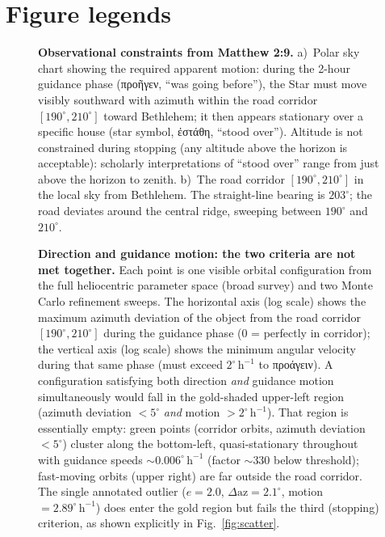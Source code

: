 \documentclass[sn-nature]{sn-jnl}
\newcommand{\grk}[1]{{\fontencoding{LGR}\selectfont #1}}
\newcommand{\grk}[1]{{\greekfont #1}}
\begin{document}
\clearpage
\section*{Figure legends}

\begin{figure}[h!]
  \caption{\textbf{Observational constraints from Matthew 2:9.}
    a)~Polar sky chart showing the required apparent motion: during
    the 2-hour guidance phase (\grk{προῆγεν}, ``was going before''), the Star
    must move visibly southward with azimuth within the road corridor
    $[190^\circ, 210^\circ]$ toward Bethlehem; it then appears stationary
    over a specific house (star symbol, \grk{ἐστάθη}, ``stood over'').
    Altitude is not constrained during stopping (any altitude above the horizon
    is acceptable): scholarly interpretations of ``stood over'' range from
    just above the horizon to zenith.
    b)~The road corridor $[190^\circ, 210^\circ]$ in the local sky
    from Bethlehem. The straight-line bearing is $203^\circ$; the road deviates
    around the central ridge, sweeping between $190^\circ$ and $210^\circ$.}
  \label{fig:sky}
\end{figure}

\begin{figure}[h!]
  \caption{\textbf{Direction and guidance motion: the two criteria are not met together.}
    Each point is one visible orbital configuration from the full
    heliocentric parameter space (broad survey) and two Monte Carlo
    refinement sweeps. The horizontal axis (log scale) shows the maximum
    azimuth deviation of the object from the road corridor
    $[190^\circ,210^\circ]$ during the guidance phase (0 = perfectly in
    corridor); the vertical axis (log scale) shows the minimum angular
    velocity during that same phase (must exceed
    $2^\circ\,\mathrm{h}^{-1}$ to \grk{προάγειν}).
    A configuration satisfying both direction \emph{and} guidance motion
    simultaneously would fall in the gold-shaded upper-left region
    (azimuth deviation $<5^\circ$ \emph{and} motion
    $>2^\circ\,\mathrm{h}^{-1}$). That region is essentially empty:
    green points (corridor orbits, azimuth deviation $<5^\circ$) cluster
    along the bottom-left, quasi-stationary throughout with guidance
    speeds ${\sim}0.006^\circ\,\mathrm{h}^{-1}$ (factor ${\sim}330$
    below threshold); fast-moving orbits (upper right) are far outside
    the road corridor. The single annotated outlier ($e=2.0$,
    $\Delta\mathrm{az}=2.1^\circ$, motion $= 2.89^\circ\,\mathrm{h}^{-1}$)
    does enter the gold region but fails the third (stopping) criterion,
    as shown explicitly in Fig.~\ref{fig:scatter}.}
  \label{fig:azmotion}
\end{figure}
\end{document}

